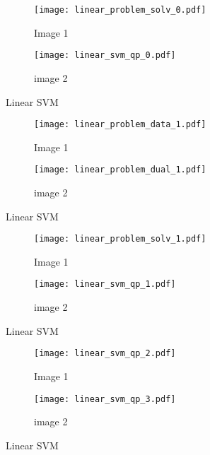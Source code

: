 \documentclass[10pt, a4paper,reqno]{amsart}
\begin{document}
\begin{figure}[H]
	\centering	
	\begin{subfigure}{1.0\textwidth}
		\centering
		\texttt{[image: linear\_problem\_solv\_0.pdf]}
		\caption{Image 1}
	\end{subfigure}
	\begin{subfigure}{1.0\textwidth}
		\centering
		\texttt{[image: linear\_svm\_qp\_0.pdf]}
		\caption{image 2}
	\end{subfigure}
	\caption{Linear SVM}
\end{figure}

\begin{figure}[H]
	\centering	
	\begin{subfigure}{1.0\textwidth}
		\centering
		\texttt{[image: linear\_problem\_data\_1.pdf]}
		\caption{Image 1}
	\end{subfigure}
	\begin{subfigure}{1.0\textwidth}
		\centering
		\texttt{[image: linear\_problem\_dual\_1.pdf]}
		\caption{image 2}
	\end{subfigure}
	\caption{Linear SVM}
\end{figure}

\begin{figure}[H]
	\centering	
	\begin{subfigure}{1.0\textwidth}
		\centering
		\texttt{[image: linear\_problem\_solv\_1.pdf]}
		\caption{Image 1}
	\end{subfigure}
	\begin{subfigure}{1.0\textwidth}
		\centering
		\texttt{[image: linear\_svm\_qp\_1.pdf]}
		\caption{image 2}
	\end{subfigure}
	\caption{Linear SVM}
\end{figure}

\begin{figure}[H]
	\centering	
	\begin{subfigure}{1.0\textwidth}
		\centering
		\texttt{[image: linear\_svm\_qp\_2.pdf]}
		\caption{Image 1}
	\end{subfigure}
	\begin{subfigure}{1.0\textwidth}
		\centering
		\texttt{[image: linear\_svm\_qp\_3.pdf]}
		\caption{image 2}
	\end{subfigure}
	\caption{Linear SVM}
\end{figure}
\end{document}
